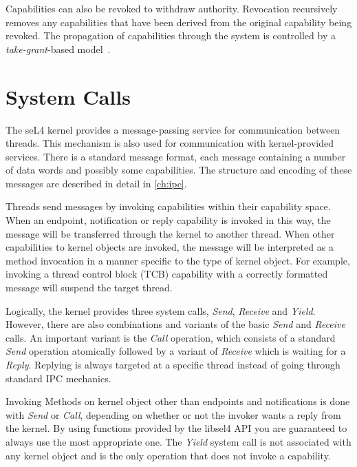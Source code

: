 Capabilities can also be revoked to withdraw
authority. Revocation recursively removes any capabilities that have
been derived from the original capability being revoked. The propagation of
capabilities through the system is controlled by a
\emph{take-grant}-based model~\cite{Elkaduwe_GE_08,Boyton_09}.

\section{System Calls}
\label{sec:syscalls}
\label{sec:sys_send}
\label{sec:sys_recv}
\label{sec:sys_call}
\label{sec:sys_reply}
\label{sec:sys_nbsend}
\label{sec:sys_replyrecv}
\label{sec:sys_nbrecv}
\label{sec:sys_yield}

The seL4 kernel provides a message-passing service for communication between
threads. This mechanism is also used for communication with kernel-provided
services. There is a standard message format, each message containing a
number of data words and possibly some capabilities. The structure and encoding
of these messages are described in detail in \autoref{ch:ipc}. 

Threads send messages by invoking capabilities within their capability space.
When an endpoint, notification or reply capability is invoked in this way, the
message will be transferred through the kernel to another thread.
When other capabilities to kernel objects are invoked, the message will be
interpreted as a method invocation in a manner specific to the type of kernel
object. For example, invoking a thread control block (TCB) capability with a
correctly formatted message will suspend the target thread.


Logically, the kernel provides three system calls, \emph{Send},
\emph{Receive} and \emph{Yield}. However, there are also combinations
and variants of the basic \emph{Send} and \emph{Receive} calls. An
important variant is the \emph{Call} operation, which consists of a standard
\emph{Send} operation atomically followed by a variant of \emph{Receive} which is waiting
for a \emph{Reply}. Replying is
always targeted at a specific thread instead of going through standard IPC mechanics.

Invoking Methods on kernel object other than endpoints and notifications
is done with \emph{Send} or \emph{Call},
depending on whether or not the invoker wants a reply from the kernel.
By using functions provided by the libsel4 API you are guaranteed to always use the most
appropriate one.
The \emph{Yield} system call is not associated with any kernel
object and is the only operation that does not invoke a capability.

